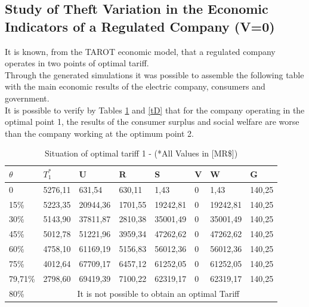 \documentclass[preprint,12pt]{elsarticle}
\begin{document}
\subsection{Study of Theft Variation in the Economic Indicators of a Regulated Company (V=0)}
\label{sec4-4}
It is known, from the TAROT economic model, that a regulated company operates in two points of optimal tariff. \\
Through the generated simulations it was possible to assemble the following table with the main economic results of the electric company, consumers and government. \\
It is possible to verify by Tables \ref {tC} and \ref {tD} that for the company operating in the optimal point 1, the results of the consumer surplus and social welfare are worse than the company working at the optimum point 2. \\

\begin{table}[h]%
\centering
\caption{Situation of optimal tariff 1 - (*All Values in [MR\$])}

\begin{tabular}{p{15mm}p{15mm}p{15mm}p{15mm}p{15mm}p{6mm}p{15mm}p{15mm}}%
\hline
$\theta $&$T_1^*$&U&R&S&V&W&G\\
\hline
0&5276,11&631,54&630,11&1,43&0&1,43&140,25\\
15\%&5223,35&20944,36&1701,55&19242,81&0&19242,81&140,25\\
30\%&5143,90&37811,87&2810,38&35001,49&0&35001,49&140,25\\
45\%&5012,78&51221,96&3959,34&47262,62&0&47262,62&140,25\\
60\%&4758,10&61169,19&5156,83&56012,36&0&56012,36&140,25\\
75\%&4012,64&67709,17&6457,12&61252,05&0&61252,05&140,25\\
79,71\%&2798,60&69419,39&7100,22&62319,17&0&62319,17&140,25\\
80\%&\multicolumn{7}{c}{It is not possible to obtain an optimal Tariff}\\

\hline
\end{tabular}

\label{tC}
\end{table}
\end{document}
